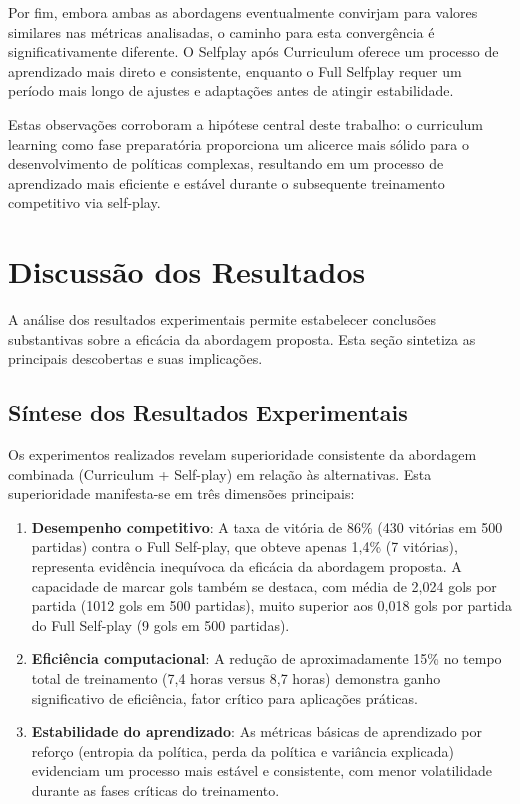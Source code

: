 Por fim, embora ambas as abordagens eventualmente convirjam para valores similares nas métricas analisadas, o caminho para esta convergência é significativamente diferente. O Selfplay após Curriculum oferece um processo de aprendizado mais direto e consistente, enquanto o Full Selfplay requer um período mais longo de ajustes e adaptações antes de atingir estabilidade.

Estas observações corroboram a hipótese central deste trabalho: o curriculum learning como fase preparatória proporciona um alicerce mais sólido para o desenvolvimento de políticas complexas, resultando em um processo de aprendizado mais eficiente e estável durante o subsequente treinamento competitivo via self-play.

\section{Discussão dos Resultados}
\label{sec:discussao_resultados}

A análise dos resultados experimentais permite estabelecer conclusões substantivas sobre a eficácia da abordagem proposta. Esta seção sintetiza as principais descobertas e suas implicações.

\subsection{Síntese dos Resultados Experimentais}

Os experimentos realizados revelam superioridade consistente da abordagem combinada (Curriculum + Self-play) em relação às alternativas. Esta superioridade manifesta-se em três dimensões principais:

\begin{enumerate}
    \item \textbf{Desempenho competitivo}: A taxa de vitória de 86\% (430 vitórias em 500 partidas) contra o Full Self-play, que obteve apenas 1,4\% (7 vitórias), representa evidência inequívoca da eficácia da abordagem proposta. A capacidade de marcar gols também se destaca, com média de 2,024 gols por partida (1012 gols em 500 partidas), muito superior aos 0,018 gols por partida do Full Self-play (9 gols em 500 partidas).

    \item \textbf{Eficiência computacional}: A redução de aproximadamente 15\% no tempo total de treinamento (7,4 horas versus 8,7 horas) demonstra ganho significativo de eficiência, fator crítico para aplicações práticas.

    \item \textbf{Estabilidade do aprendizado}: As métricas básicas de aprendizado por reforço (entropia da política, perda da política e variância explicada) evidenciam um processo mais estável e consistente, com menor volatilidade durante as fases críticas do treinamento.
\end{enumerate}

